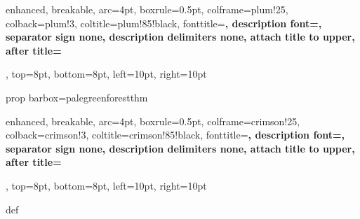 
\usepackage[margin=2.5cm]{geometry}
\usepackage{lmodern}
\usepackage[T1]{fontenc}

\usepackage{amsmath, amssymb, amsthm, mathrsfs}
\usepackage{cancel}                         %
\usepackage{esvect}                         %
\renewcommand{\vec}[1]{\vv{#1}}
\newcommand{\sL}{\mathscr{L}}               %
\DeclareMathOperator{\range}{range}
\DeclareMathOperator{\Null}{null}
\renewcommand{\qedsymbol}{$\odot$}

\usepackage{enumitem}

\usepackage[most]{tcolorbox}


  {enhanced, breakable, arc=4pt, boxrule=0.5pt,
   colframe=plum!25, colback=plum!3,
   coltitle=plum!85!black, fonttitle=\sffamily\bfseries\small,
   description font=\sffamily\mdseries\small,
   separator sign none, description delimiters none,
   attach title to upper, after title={\par\smallskip},
   top=8pt, bottom=8pt, left=10pt, right=10pt}{prop}
  {barbox={palegreen}{forest}}{thm}
  {enhanced, breakable, arc=4pt, boxrule=0.5pt,
   colframe=crimson!25, colback=crimson!3,
   coltitle=crimson!85!black, fonttitle=\sffamily\bfseries\small,
   description font=\sffamily\mdseries\small,
   separator sign none, description delimiters none,
   attach title to upper, after title={\par\smallskip},
   top=8pt, bottom=8pt, left=10pt, right=10pt}{def}

